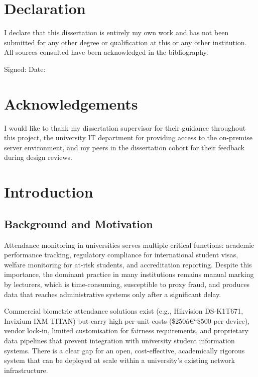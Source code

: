 \documentclass[12pt,a4paper]{report}
\begin{document}
\chapter*{Declaration}
I declare that this dissertation is entirely my own work and has not been submitted for any other degree or qualification at this or any other institution. All sources consulted have been acknowledged in the bibliography.

\vspace{2cm}
\noindent Signed: \underline{\hspace{6cm}} \hfill Date: \underline{\hspace{3cm}}

\chapter*{Acknowledgements}
I would like to thank my dissertation supervisor for their guidance throughout this project, the university IT department for providing access to the on-premise server environment, and my peers in the dissertation cohort for their feedback during design reviews.

\tableofcontents
\listoffigures
\listoftables

\chapter{Introduction}

\section{Background and Motivation}
Attendance monitoring in universities serves multiple critical functions: academic performance tracking, regulatory compliance for international student visas, welfare monitoring for at-risk students, and accreditation reporting. Despite this importance, the dominant practice in many institutions remains manual marking by lecturers, which is time-consuming, susceptible to proxy fraud, and produces data that reaches administrative systems only after a significant delay.

Commercial biometric attendance solutions exist (e.g., Hikvision DS-K1T671, Invixium IXM TITAN) but carry high per-unit costs (\$250â€“\$500 per device), vendor lock-in, limited customisation for fairness requirements, and proprietary data pipelines that prevent integration with university student information systems. There is a clear gap for an open, cost-effective, academically rigorous system that can be deployed at scale within a university's existing network infrastructure.
\end{document}
